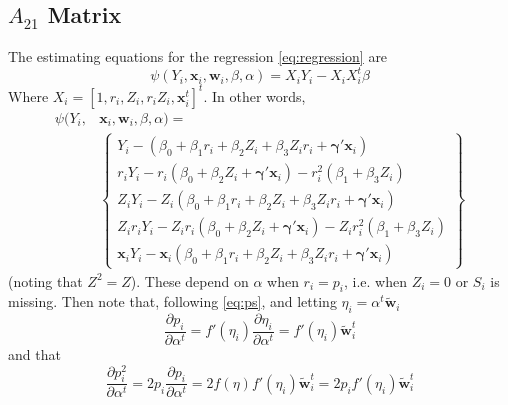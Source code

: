 \documentclass[11pt]{article} %
\begin{document}
\subsection{$A_{21}$ Matrix}
The estimating equations for the regression \eqref{eq:regression} are
\begin{equation}\label{eq:eeOLS}
  \psi(Y_i,\bm{x}_i,\bm{w}_i,\beta,\alpha)=X_iY_i-X_iX_i^t\beta
\end{equation}
Where $X_i=[1,r_i,Z_i,r_iZ_i,\bm{x}_i^t]^t$.
In other words,
\begin{align*}
  \psi(Y_i,&\bm{x}_i,\bm{w}_i,\beta,\alpha)=\\
  &\left\{
  \begin{array}{l}
    Y_i-\left(\beta_0+\beta_1r_i+\beta_2Z_i+\beta_3Z_ir_i+\bm{\gamma}'\bm{x}_i\right)\\
    r_iY_i-r_i\left(\beta_0+\beta_2Z_i+\bm{\gamma}'\bm{x}_i\right)-r_i^2\left(\beta_1+\beta_3Z_i\right)\\
    Z_iY_i-Z_i\left(\beta_0+\beta_1r_i+\beta_2Z_i+\beta_3Z_ir_i+\bm{\gamma}'\bm{x}_i\right)\\
    Z_ir_iY_i-Z_ir_i\left(\beta_0+\beta_2Z_i+\bm{\gamma}'\bm{x}_i\right)-Z_ir_i^2\left(\beta_1+\beta_3Z_i\right)\\
    \bm{x}_iY_i-\bm{x}_i\left(\beta_0+\beta_1r_i+\beta_2Z_i+\beta_3Z_ir_i+\bm{\gamma}'\bm{x}_i\right)
  \end{array}
  \right\}
\end{align*}
(noting that $Z^2=Z$).
These depend on $\alpha$ when $r_i=p_i$, i.e. when $Z_i=0$ or $S_i$ is missing.
Then note that, following \eqref{eq:ps}, and letting $\eta_i=\alpha^t\bm{\tilde{w}}_i$
\begin{equation}\label{eq:derivP}
  \frac{\partial p_i}{\partial \alpha^t}=f'(\eta_i)\frac{\partial \eta_i}{\partial \alpha^t}=f'(\eta_i)\bm{\tilde{w}}_i^t
\end{equation}
and that
\begin{equation}
  \frac{\partial p_i^2}{\partial \alpha^t}=2p_i\frac{\partial p_i}{\partial \alpha^t}=2f(\eta)f'(\eta_i)\bm{\tilde{w}}_i^t=2p_if'(\eta_i)\bm{\tilde{w}}_i^t
\end{equation}
\end{document}
